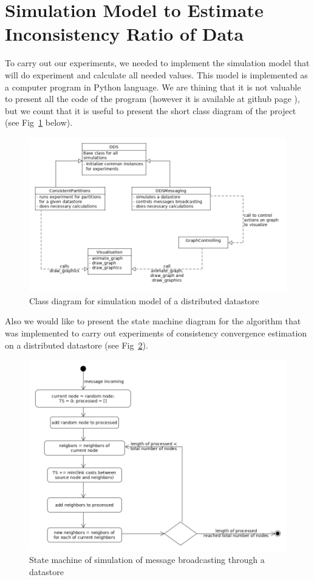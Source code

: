 \documentclass{llncs}
\begin{document}
\section{Simulation Model to Estimate Inconsistency Ratio of Data}\label{sec:simulation}
To carry out our experiments, we needed to implement the simulation model that will do experiment and calculate all needed values. This model is implemented as a computer program in Python language. We are thining that it is not valuable to present all the code of the program (however it is available at github page \cite{bib:github_dds}), but we count that it is useful to present the short class diagram of the project (see Fig~\ref{pic:diagram} below).
\begin{figure}
\centering\includegraphics[scale=0.4]{images/dds-class-diagram.png}
\caption{Class diagram for simulation model of a distributed datastore}
\label{pic:diagram}
\end{figure}
%
Also we would like to present the state machine diagram for the algorithm that was implemented to carry out experiments of consistency convergence estimation on a distributed datastore (see Fig~\ref{pic:state-machine}).
\begin{figure}[t]
\centering\includegraphics[scale=0.4]{images/message-broadcasting-state-machine.png}
\caption{State machine of simulation of message broadcasting through a datastore}\label{pic:state-machine}
\end{figure}
\end{document}
